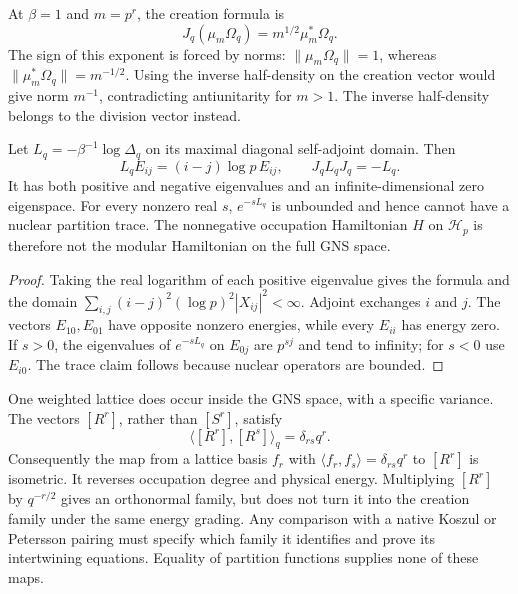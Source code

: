 At $\beta=1$ and $m=p^r$, the creation formula is
\[
 J_q(\mu_m\Omega_q)=m^{1/2}\mu_m^*\Omega_q.
\]
The sign of this exponent is forced by norms:
$\|\mu_m\Omega_q\|=1$, whereas
$\|\mu_m^*\Omega_q\|=m^{-1/2}$.
Using the inverse half-density on the creation vector would give
norm $m^{-1}$, contradicting antiunitarity for $m>1$.
The inverse half-density belongs to the division vector instead.

\begin{proposition}
\label{v4-arith:thermal:modular-energy}
Let $L_q=-\beta^{-1}\log\Delta_q$ on its maximal diagonal
self-adjoint domain. Then
\[
 L_qE_{ij}=(i-j)\log p\,E_{ij},\qquad J_qL_qJ_q=-L_q.
\]
It has both positive and negative eigenvalues and an
infinite-dimensional zero eigenspace. For every nonzero real $s$,
$e^{-sL_q}$ is unbounded and hence cannot have a nuclear partition
trace. The nonnegative occupation Hamiltonian $H$ on
$\mathscr H_p$ is therefore not the modular Hamiltonian on the
full GNS space.
\end{proposition}

\begin{proof}
Taking the real logarithm of each positive eigenvalue gives the
formula and the domain
$\sum_{i,j}(i-j)^2(\log p)^2|X_{ij}|^2<\infty$.
Adjoint exchanges $i$ and $j$. The vectors $E_{10},E_{01}$
have opposite nonzero energies, while every $E_{ii}$ has energy
zero. If $s>0$, the eigenvalues of $e^{-sL_q}$ on $E_{0j}$
are $p^{sj}$ and tend to infinity; for $s<0$ use $E_{i0}$.
The trace claim follows because nuclear operators are bounded.
\end{proof}

One weighted lattice does occur inside the GNS space, with a
specific variance. The vectors $[R^r]$, rather than $[S^r]$,
satisfy
\[
 \langle[R^r],[R^s]\rangle_q=\delta_{rs}q^r.
\]
Consequently the map from a lattice basis $f_r$ with
$\langle f_r,f_s\rangle=\delta_{rs}q^r$ to $[R^r]$ is
isometric. It reverses occupation degree and physical energy.
Multiplying $[R^r]$ by $q^{-r/2}$ gives an orthonormal family,
but does not turn it into the creation family under the same
energy grading. Any comparison with a native Koszul or Petersson
pairing must specify which family it identifies and prove its
intertwining equations. Equality of partition functions supplies
none of these maps.

